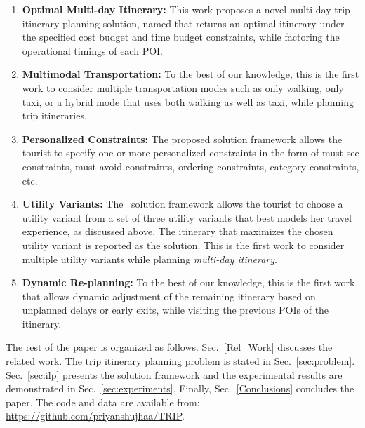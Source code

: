 \begin{enumerate}
\item \textbf{Optimal Multi-day Itinerary:} This work proposes a novel multi-day trip itinerary planning solution, named \trip that returns an optimal itinerary under the specified cost budget and time budget constraints, while factoring the operational timings of each POI.  
\item \textbf{Multimodal Transportation:} To the best of our knowledge, this is the first work to consider multiple transportation modes such as only walking, only taxi, or a hybrid mode that uses both walking as well as taxi, while planning trip itineraries.
\item \textbf{Personalized Constraints:} The proposed solution framework allows the tourist to specify one or more personalized constraints in the form of must-see constraints, must-avoid constraints, ordering constraints, category constraints, etc.
\item \textbf{Utility Variants:} The \trip~solution framework allows the tourist to choose a utility variant from a set of three utility variants that best models her travel experience, as discussed above. The itinerary that maximizes the chosen utility variant is reported as the solution. This is the first work to consider multiple utility variants while planning \emph{multi-day itinerary}.
\item \textbf{Dynamic Re-planning:} To the best of our knowledge, this is the first work that allows dynamic adjustment of the remaining itinerary based on unplanned delays or early exits, while visiting the previous POIs of the itinerary.
%
\end{enumerate}

 The rest of the paper is organized as follows. Sec.~\ref{Rel_Work}  discusses the related work. The trip itinerary planning problem is stated in Sec.~\ref{sec:problem}. Sec.~\ref{sec:ilp} presents the \trip solution framework and the experimental results are demonstrated in Sec.~\ref{sec:experiments}. Finally, Sec.~\ref{Conclusions} concludes the paper.
The code and data are available from: \url{https://github.com/priyanshujhaa/TRIP}.
